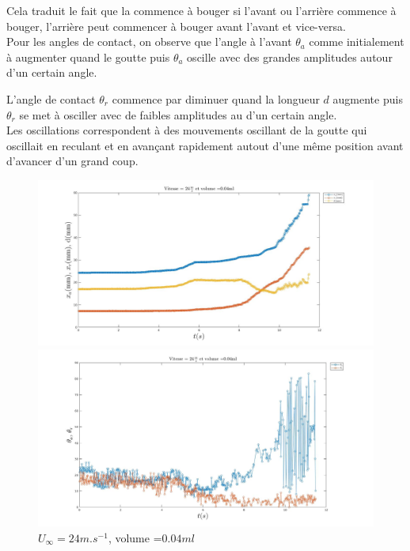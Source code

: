 \documentclass[french]{article}
\begin{document}
Cela traduit le fait que la commence à bouger si l'avant ou l'arrière commence à bouger, l'arrière peut commencer à bouger avant l'avant et vice-versa.\\

Pour les angles de contact, on observe que l'angle à l'avant $\theta_{a}$ comme initialement à augmenter quand le goutte puis $\theta_{a}$ oscille avec des grandes amplitudes autour d'un certain angle.

L'angle de contact $\theta_{r}$ commence par diminuer quand la longueur $d$ augmente puis $\theta_{r}$ se met à osciller avec de faibles amplitudes au d'un certain angle.\\

Les oscillations correspondent à des mouvements oscillant de la goutte qui oscillait en reculant et en avançant rapidement autout d'une même position avant d'avancer d'un grand coup.

\newpage
\begin{figure}[!ht]
	\centering
	\begin{minipage}{0.95\linewidth}
		\includegraphics[width=\linewidth]{./image/v=24_vol=004_xaxrd.jpg}
		\caption{$\textcolor{blue}{x_{a}}$,
		$\textcolor{red}{x_{r}}$, $\textcolor{yellow}{d}$}
		\label{fig:entre_xaxrd}
	\end{minipage}
	\vfill
	\begin{minipage}{0.95\linewidth}
		\includegraphics[width=\linewidth]{./image/v=24_vol=004_oaor.jpg}
		\caption{$\textcolor{blue}{\theta_{a}}$,
		$\textcolor{red}{\theta_{r}}$}
		\label{fig:entre_oaor}
	\end{minipage}
	\caption{$U_{\infty}=24m.s^{-1}$, volume =$0.04ml$}
 \end{figure}
\end{document}
